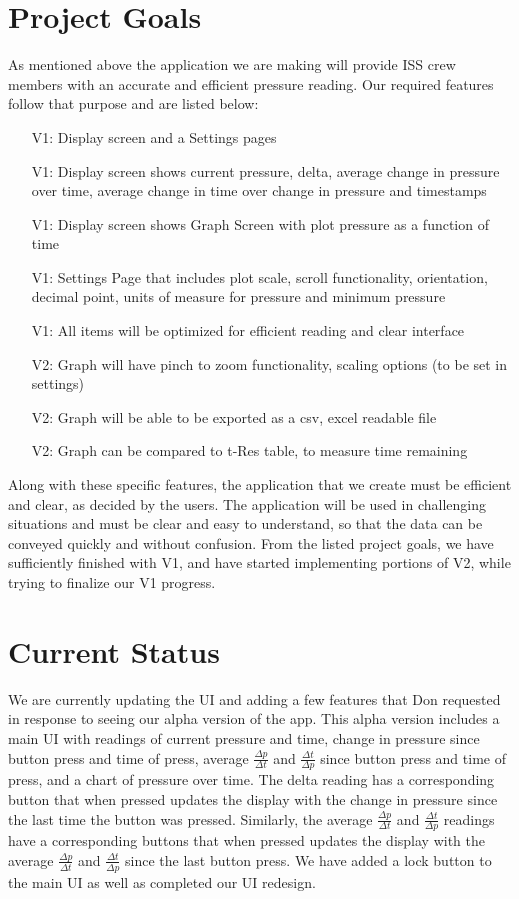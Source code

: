 \documentclass[onecolumn, draftclsnofoot,10pt, compsoc]{IEEEtran}
\begin{document}
\section{Project Goals}
As mentioned above the application we are making will provide ISS crew members with an accurate and efficient pressure reading.
Our required features follow that purpose and are listed below:
\begin{itemize}
\item[V1:] Display screen and a Settings pages
\item [V1:] Display screen shows current pressure, delta, average change in pressure over time, average change in time over change in pressure and timestamps
\item[V1:]  Display screen shows Graph Screen with plot pressure as a function of time
\item[V1:] Settings Page that includes plot scale, scroll functionality, orientation, decimal point, units of measure for pressure and minimum pressure
\item[V1:] All items will be optimized for efficient reading and clear interface
\item[V2:] Graph will have pinch to zoom functionality, scaling options (to be set in settings)
\item[V2:] Graph will be able to be exported as a csv, excel readable file
\item[V2:] Graph can be compared to t-Res table, to measure time remaining
\end{itemize}

Along with these specific features, the application that we create must be efficient and clear, as decided by the users.
The application will be used in challenging situations and must be clear and easy to understand, so that the data can be conveyed quickly and without confusion.
From the listed project goals, we have sufficiently finished with V1, and have started implementing portions of V2, while trying to finalize our V1 progress.


\section{Current Status}
    We are currently updating the UI and adding a few features that Don requested in response to seeing our alpha version of the app.
    This alpha version includes a main UI with readings of current pressure and time, change in pressure since button press and time of press, average $\frac{\Delta p}{\Delta t}$ and $\frac{\Delta t}{\Delta p}$ since button press and time of press, and a chart of pressure over time.
    The delta reading has a corresponding button that when pressed updates the display with the change in pressure since the last time the button was pressed.
    Similarly, the average $\frac{\Delta p}{\Delta t}$ and $\frac{\Delta t}{\Delta p}$ readings have a corresponding buttons that when pressed updates the display with the average $\frac{\Delta p}{\Delta t}$ and $\frac{\Delta t}{\Delta p}$ since the last button press.
    We have added a lock button to the main UI as well as completed our UI redesign.
\end{document}

